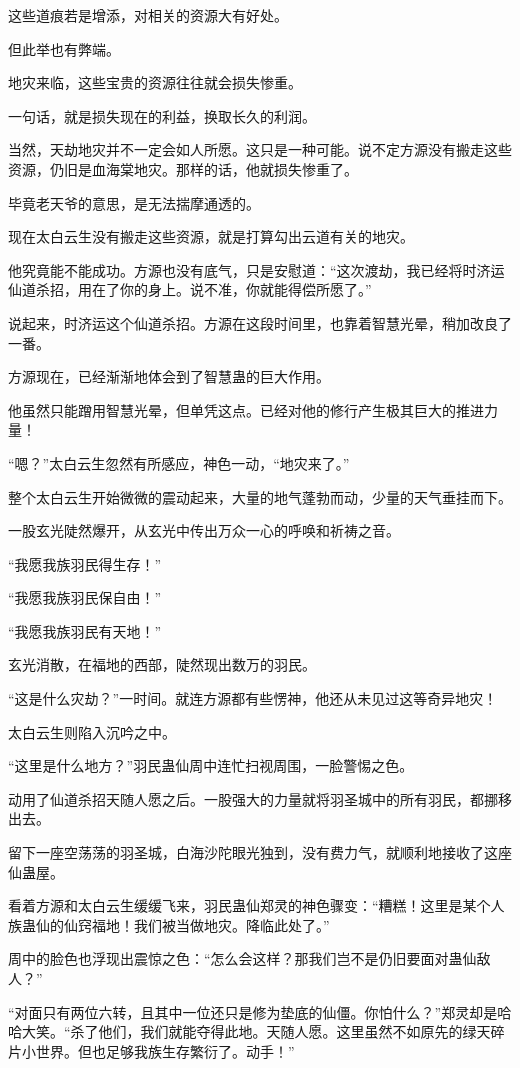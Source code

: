\begin{this_body}
这些道痕若是增添，对相关的资源大有好处。

但此举也有弊端。

地灾来临，这些宝贵的资源往往就会损失惨重。

一句话，就是损失现在的利益，换取长久的利润。

当然，天劫地灾并不一定会如人所愿。这只是一种可能。说不定方源没有搬走这些资源，仍旧是血海棠地灾。那样的话，他就损失惨重了。

毕竟老天爷的意思，是无法揣摩通透的。

现在太白云生没有搬走这些资源，就是打算勾出云道有关的地灾。

他究竟能不能成功。方源也没有底气，只是安慰道：“这次渡劫，我已经将时济运仙道杀招，用在了你的身上。说不准，你就能得偿所愿了。”

说起来，时济运这个仙道杀招。方源在这段时间里，也靠着智慧光晕，稍加改良了一番。

方源现在，已经渐渐地体会到了智慧蛊的巨大作用。

他虽然只能蹭用智慧光晕，但单凭这点。已经对他的修行产生极其巨大的推进力量！

“嗯？”太白云生忽然有所感应，神色一动，“地灾来了。”

整个太白云生开始微微的震动起来，大量的地气蓬勃而动，少量的天气垂挂而下。

一股玄光陡然爆开，从玄光中传出万众一心的呼唤和祈祷之音。

“我愿我族羽民得生存！”

“我愿我族羽民保自由！”

“我愿我族羽民有天地！”

玄光消散，在福地的西部，陡然现出数万的羽民。

“这是什么灾劫？”一时间。就连方源都有些愣神，他还从未见过这等奇异地灾！

太白云生则陷入沉吟之中。

“这里是什么地方？”羽民蛊仙周中连忙扫视周围，一脸警惕之色。

动用了仙道杀招天随人愿之后。一股强大的力量就将羽圣城中的所有羽民，都挪移出去。

留下一座空荡荡的羽圣城，白海沙陀眼光独到，没有费力气，就顺利地接收了这座仙蛊屋。

看着方源和太白云生缓缓飞来，羽民蛊仙郑灵的神色骤变：“糟糕！这里是某个人族蛊仙的仙窍福地！我们被当做地灾。降临此处了。”

周中的脸色也浮现出震惊之色：“怎么会这样？那我们岂不是仍旧要面对蛊仙敌人？”

“对面只有两位六转，且其中一位还只是修为垫底的仙僵。你怕什么？”郑灵却是哈哈大笑。“杀了他们，我们就能夺得此地。天随人愿。这里虽然不如原先的绿天碎片小世界。但也足够我族生存繁衍了。动手！”


\end{this_body}
